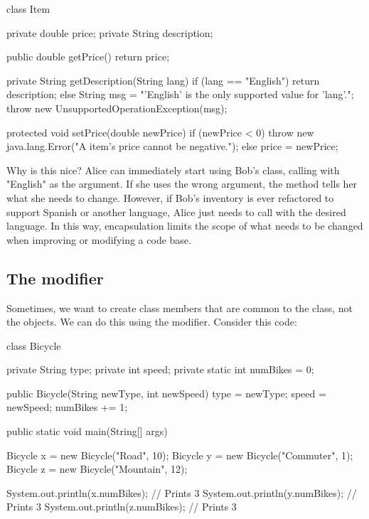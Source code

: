 \begin{code}
class Item {
  
  private double price;
  private String description;
  
  public double getPrice() {
    return price;
  }
  
  private String getDescription(String lang) {
    if (lang == "English") {
      return description;
    } else {
      String msg = "'English' is the only supported value for 'lang'.";
      throw new UnsupportedOperationException(msg);
    }
  }
  
  protected void setPrice(double newPrice) {
    if (newPrice < 0) {
      throw new java.lang.Error("A item's price cannot be negative.");
    } else {
      price = newPrice;
    }
  }
}
\end{code}

Why is this nice? Alice can immediately start using Bob's  class, calling  with "English" as the argument. If she uses the wrong  argument, the method tells her what she needs to change. However, if Bob's inventory is ever refactored to support Spanish or another language, Alice just needs to call  with the desired language. In this way, encapsulation limits the scope of what needs to be changed when improving or modifying a code base.

\subsection{The  modifier}

Sometimes, we want to create class members that are common to the class, not the objects. We can do this using the  modifier. Consider this code:


\begin{code}
class Bicycle {
  
    private String type;
    private int speed;
    private static int numBikes = 0;
    
    public Bicycle(String newType, int newSpeed) {
      type = newType;
      speed = newSpeed;
      numBikes += 1;
    }
    
    public static void main(String[] args) {
      Bicycle x = new Bicycle("Road", 10);
      Bicycle y = new Bicycle("Commuter", 1);
      Bicycle z = new Bicycle("Mountain", 12);

      System.out.println(x.numBikes);  // Prints 3
      System.out.println(y.numBikes);  // Prints 3
      System.out.println(z.numBikes);  // Prints 3
    }
}
\end{code}

